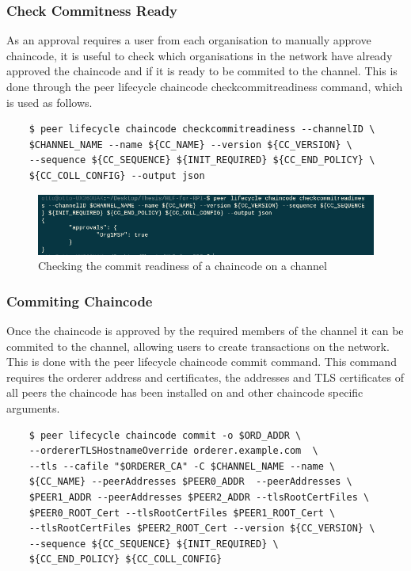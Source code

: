 \subsubsection{Check Commitness Ready}

As an approval requires a user from each organisation to manually approve chaincode, it is useful to check which organisations in the network have already approved the chaincode and if it is ready to be commited to the channel. This is done through the peer lifecycle chaincode checkcommitreadiness command, which is used as follows.

\begin{verbatim}
    $ peer lifecycle chaincode checkcommitreadiness --channelID \
    $CHANNEL_NAME --name ${CC_NAME} --version ${CC_VERSION} \
    --sequence ${CC_SEQUENCE} ${INIT_REQUIRED} ${CC_END_POLICY} \
    ${CC_COLL_CONFIG} --output json 
\end{verbatim}

\begin{figure}[h]
    \centering
    \includegraphics{images/checkcommitready.PNG}
    \caption{Checking the commit readiness of a chaincode on a channel}
    \label{fig:my_label}
\end{figure}

\subsubsection{Commiting Chaincode}

Once the chaincode is approved by the required members of the channel it can be commited to the channel, allowing users to create transactions on the network. This is done with the peer lifecycle chaincode commit command. This command requires the orderer address and certificates, the addresses and TLS certificates of all peers the chaincode has been installed on and other chaincode specific arguments.


\begin{verbatim}
    $ peer lifecycle chaincode commit -o $ORD_ADDR \
    --ordererTLSHostnameOverride orderer.example.com  \
    --tls --cafile "$ORDERER_CA" -C $CHANNEL_NAME --name \
    ${CC_NAME} --peerAddresses $PEER0_ADDR  --peerAddresses \  
    $PEER1_ADDR --peerAddresses $PEER2_ADDR --tlsRootCertFiles \ 
    $PEER0_ROOT_Cert --tlsRootCertFiles $PEER1_ROOT_Cert \ 
    --tlsRootCertFiles $PEER2_ROOT_Cert --version ${CC_VERSION} \ 
    --sequence ${CC_SEQUENCE} ${INIT_REQUIRED} \ 
    ${CC_END_POLICY} ${CC_COLL_CONFIG}
\end{verbatim}


